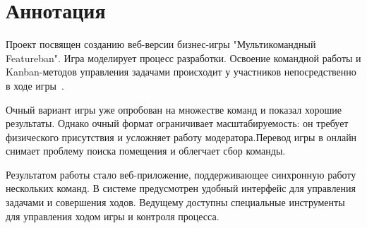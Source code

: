 \section{Аннотация} 

Проект посвящен созданию веб-версии бизнес-игры "Мультикомандный Featureban". Игра моделирует процесс разработки. Освоение командной работы и Kanban-методов управления задачами происходит у участников непосредственно в ходе игры~\cite{kanban-book-bor}. 

Очный вариант игры уже опробован на множестве команд и показал хорошие результаты. Однако очный формат ограничивает масштабируемость: он требует физического присутствия и усложняет работу модератора.Перевод игры в онлайн снимает проблему поиска помещения и облегчает сбор команды. 

Результатом работы стало веб-приложение, поддерживающее синхронную работу нескольких команд. В системе предусмотрен удобный интерфейс для управления задачами и совершения ходов. Ведущему доступны специальные инструменты для управления ходом игры и контроля процесса.
